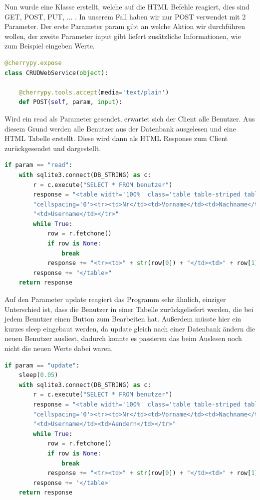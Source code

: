 Nun wurde eine Klasse erstellt, welche auf die HTML Befehle reagiert, dies sind GET, POST, PUT, ... . In unserem Fall haben wir nur POST verwendet mit 2 Parameter. Der erste Parameter param gibt an welche Aktion wir durchführen wollen, der zweite Parameter input gibt liefert zusätzliche Informationen, wie zum Beispiel eingeben Werte.

\begin{lstlisting}[language=Python, caption=Klasse zur verwaltung der HTML Befehle]
@cherrypy.expose
class CRUDWebService(object):

	@cherrypy.tools.accept(media='text/plain')
	def POST(self, param, input):
\end{lstlisting}

Wird ein read als Parameter gesendet, erwartet sich der Client alle Benutzer. Aus diesem Grund werden alle Benutzer aus der Datenbank ausgelesen und eine HTML Tabelle erstellt. Diese wird dann als HTML Response zum Client zurückgesendet und dargestellt.

\begin{lstlisting}[language=Python, caption=Auslesen aller Benutzer aus der Datenbank]
if param == "read":
	with sqlite3.connect(DB_STRING) as c:
		r = c.execute("SELECT * FROM benutzer")
		response = "<table width='100%' class='table table-striped table-bordered'" \
		"cellspacing='0'><tr><td>Nr</td><td>Vorname</td><td>Nachname</td>" \
		"<td>Username</td></tr>"
		while True:
			row = r.fetchone()
			if row is None:
				break
			response += "<tr><td>" + str(row[0]) + "</td><td>" + row[1] + "</td><td>" + row[2] + 		"</td><td>" + row[3] + "</td></tr>"
		response += "</table>"
	return response
\end{lstlisting}

Auf den Parameter update reagiert das Programm sehr ähnlich, einziger Unterschied ist, dass die Benutzer in einer Tabelle zurückgeliefert werden, die bei jedem Benutzer einen Button zum Bearbeiten hat. Außerdem müsste hier ein kurzes sleep eingebaut werden, da update gleich nach einer Datenbank ändern die neuen Benutzer ausliest, dadurch konnte es passieren das beim Auslesen noch nicht die neuen Werte dabei waren.

\begin{lstlisting}[language=Python, caption=Auslesen aller Benutzer aus der Datenbank und bearbeitbar zurückliefern]
if param == "update":
	sleep(0.05)
	with sqlite3.connect(DB_STRING) as c:
		r = c.execute("SELECT * FROM benutzer")
		response = "<table width='100%' class='table table-striped table-bordered'" \
		"cellspacing='0'><tr><td>Nr</td><td>Vorname</td><td>Nachname</td>" \
		"<td>Username</td><td>Aendern</td></tr>"
		while True:
			row = r.fetchone()
			if row is None:
				break
			response += "<tr><td>" + str(row[0]) + "</td><td>" + row[1] + "</td><td>" + row[2] + "</td><td>" + row[3] + "</td><td> <button onClick='updateBenutzer(" + str(row[0]) + ")'>Aendern</button></td></tr>"
		response += '</table>'
	return response
\end{lstlisting}

